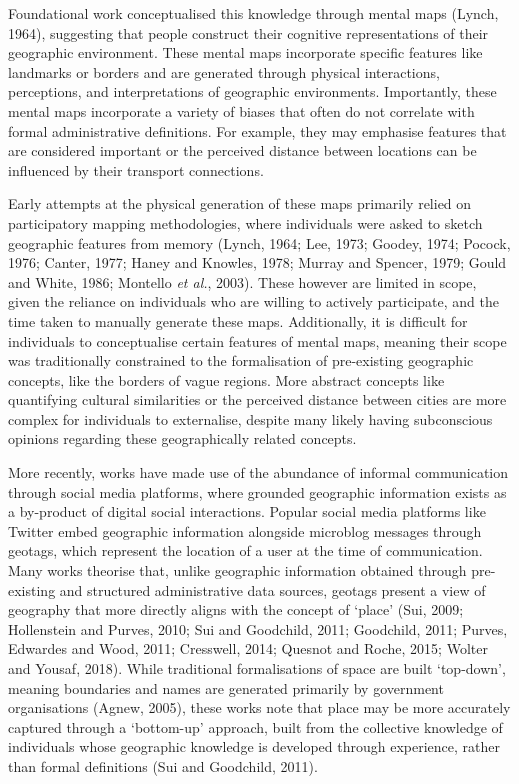 \documentclass[
  letterpaper,
  11pt,
  english,
  onehalfspacing,
  headsepline]{MastersDoctoralThesis}
\begin{document}
Foundational work conceptualised this knowledge through mental maps
(Lynch, 1964), suggesting that people construct their cognitive
representations of their geographic environment. These mental maps
incorporate specific features like landmarks or borders and are
generated through physical interactions, perceptions, and
interpretations of geographic environments. Importantly, these mental
maps incorporate a variety of biases that often do not correlate with
formal administrative definitions. For example, they may emphasise
features that are considered important or the perceived distance between
locations can be influenced by their transport connections.

Early attempts at the physical generation of these maps primarily relied
on participatory mapping methodologies, where individuals were asked to
sketch geographic features from memory (Lynch, 1964; Lee, 1973; Goodey,
1974; Pocock, 1976; Canter, 1977; Haney and Knowles, 1978; Murray and
Spencer, 1979; Gould and White, 1986; Montello \emph{et al.}, 2003).
These however are limited in scope, given the reliance on individuals
who are willing to actively participate, and the time taken to manually
generate these maps. Additionally, it is difficult for individuals to
conceptualise certain features of mental maps, meaning their scope was
traditionally constrained to the formalisation of pre-existing
geographic concepts, like the borders of vague regions. More abstract
concepts like quantifying cultural similarities or the perceived
distance between cities are more complex for individuals to externalise,
despite many likely having subconscious opinions regarding these
geographically related concepts.

More recently, works have made use of the abundance of informal
communication through social media platforms, where grounded geographic
information exists as a by-product of digital social interactions.
Popular social media platforms like Twitter embed geographic information
alongside microblog messages through geotags, which represent the
location of a user at the time of communication. Many works theorise
that, unlike geographic information obtained through pre-existing and
structured administrative data sources, geotags present a view of
geography that more directly aligns with the concept of `place' (Sui,
2009; Hollenstein and Purves, 2010; Sui and Goodchild, 2011; Goodchild,
2011; Purves, Edwardes and Wood, 2011; Cresswell, 2014; Quesnot and
Roche, 2015; Wolter and Yousaf, 2018). While traditional formalisations
of space are built `top-down', meaning boundaries and names are
generated primarily by government organisations (Agnew, 2005), these
works note that place may be more accurately captured through a
`bottom-up' approach, built from the collective knowledge of individuals
whose geographic knowledge is developed through experience, rather than
formal definitions (Sui and Goodchild, 2011).
\end{document}
